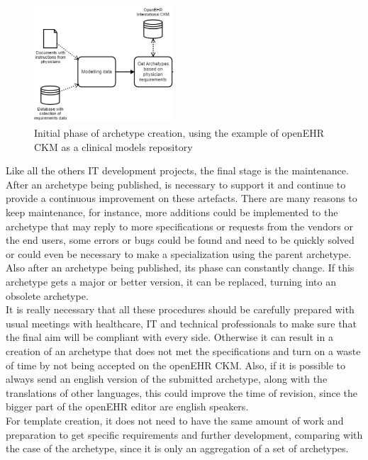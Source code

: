 \documentclass[mim_thesis.tex]{subfiles}
\begin{document}
\begin{figure}[H]
	\centering
    \includegraphics[width=0.465\textwidth]{img/LC_ARCH.PNG}
	\caption{Initial phase of archetype creation, using the example of openEHR CKM as a clinical models repository}
	\label{fig:LC_ARCH}
\end{figure}

Like all the others IT development projects, the final stage is the maintenance. After an archetype being published, is necessary to support it and continue to provide a continuous improvement on these artefacts. There are many reasons to keep maintenance, for instance, more additions could be implemented to the archetype that may reply to more specifications or requests from the vendors or the end users, some errors or bugs could be found and need to be quickly solved or could even be necessary to make a specialization using the parent archetype. Also after an archetype being published, its phase can constantly change. If this archetype gets a major or better version, it can be replaced, turning into an obsolete archetype. \\

It is really necessary that all these procedures should be carefully prepared with usual meetings with healthcare, IT and technical professionals to make sure that the final aim will be compliant with every side. Otherwise it can result in a creation of an archetype that does not met the specifications and turn on a waste of time by not being accepted on the openEHR CKM. Also, if it is possible to always send an english version of the submitted archetype, along with the translations of other languages, this could improve the time of revision, since the bigger part of the openEHR editor are english speakers. \\

For template creation, it does not need to have the same amount of work and preparation to get specific requirements and further development, comparing with the case of the archetype, since it is only an aggregation of a set of archetypes. \\
\end{document}
